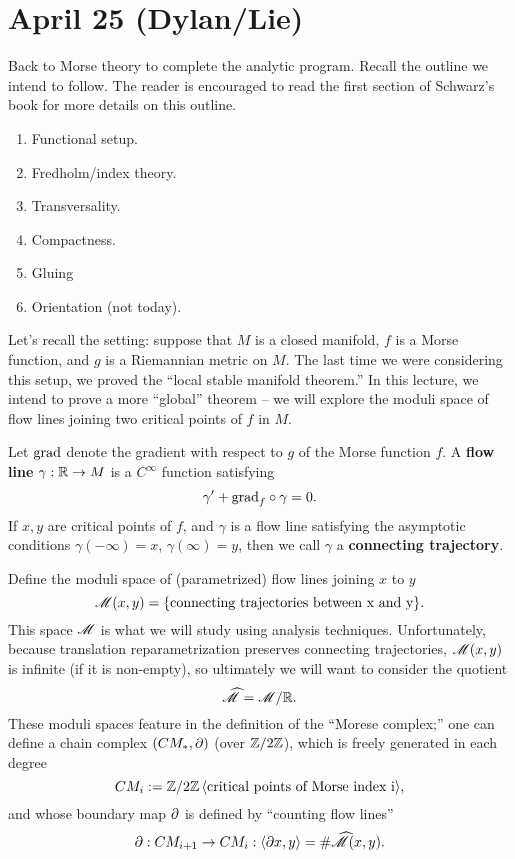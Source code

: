 \documentclass{amsart}
\begin{document}
\section*{\textbf{April 25 (Dylan/Lie)}}

Back to Morse theory to complete the analytic program. Recall the
outline we intend to follow. The reader is encouraged to read the
first section of Schwarz's book for more details on this outline.

\begin{enumerate}
\item Functional setup.
\item Fredholm/index theory.
\item Transversality.
\item Compactness.
\item Gluing
\item Orientation (not today).
\end{enumerate}

Let's recall the setting: suppose that $M$ is a closed manifold, $f$
is a Morse function, and $g$ is a Riemannian metric on $M$. The last
time we were considering this setup, we proved the ``local stable
manifold theorem.'' In this lecture, we intend to prove a more
``global'' theorem -- we will explore the moduli space of flow lines
joining two critical points of $f$ in $M$. 

Let $\mathrm{grad}$ denote the gradient with respect to $g$ of the Morse
function $f$. A \textbf{flow line} $\gamma:\mathbb{R}\to M$ is a $C^{\infty}$
function satisfying
\[
  \gamma'+\mathrm{grad}_f\circ \gamma=0.
\]
If $x,y$ are critical points of $f$, and $\gamma$ is a flow line
satisfying the asymptotic conditions $\gamma(-\infty)=x$,
$\gamma(\infty)=y$, then we call $\gamma$ a \textbf{connecting trajectory}.

Define the moduli space of (parametrized) flow lines joining $x$ to $y$ $$\mathscr{M}(x,y)=\{\text{connecting trajectories between x and y}\}.$$ This space $\mathscr{M}$
is what we will study using analysis techniques. Unfortunately,
because translation reparametrization preserves connecting
trajectories, $\mathscr{M}(x,y)$ is infinite (if it is non-empty), so
ultimately we will want to consider the quotient
\begin{equation*}
  \widehat{\mathscr{M}}=\mathscr{M}/\mathbb{R}.
\end{equation*}
These moduli spaces feature in the definition of the ``Morese
complex;'' one can define a chain complex $(CM_\ast,\partial)$ (over
$\mathbb{Z}/2\mathbb{Z}$), which is freely generated in each degree
$$CM_{i}:=\mathbb{Z}/2\mathbb{Z}\,\langle \text{\text{critical points of Morse index
  i}}\rangle,$$ and whose boundary map $\partial$ is defined by ``counting flow lines''
$$\partial:CM_{i+1}\to CM_i:\langle \partial x,y\rangle=\#\widehat{\mathscr{M}}(x,y).$$
\end{document}
